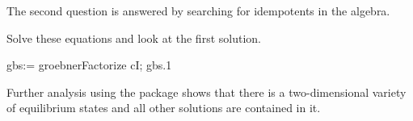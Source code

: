 {{{{{{{{{{{{{{{{{{\begin{xtc}
\begin{xtccomment}
The second question is answered by searching for idempotents in the
algebra.
\end{xtccomment}
\begin{TeXOutput}
\begin{fricasmath}{11}
%
\end{fricasmath}
\end{TeXOutput}
\end{xtc}
\begin{xtc}
\begin{xtccomment}
Solve these equations and look at the first solution.
\end{xtccomment}
\begin{spadsrc}
gbs:= groebnerFactorize cI; gbs.1
\end{spadsrc}
\begin{TeXOutput}
\begin{fricasmath}{12}
%
\end{fricasmath}
\end{TeXOutput}
\end{xtc}

Further analysis using the package 
shows that there is a two-dimensional variety of equilibrium states and all
other solutions are contained in it.

}}}}}}}}}}}}}}}}}}
